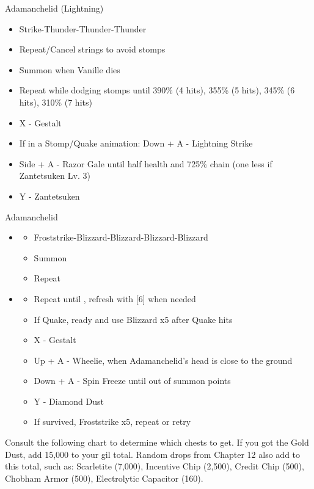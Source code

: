 \begin{paracol}{2}
\begin{battle}{Adamanchelid (Lightning)}
\begin{itemize}
\begin{itemize}
			      \item Strike-Thunder-Thunder-Thunder
			      \item Repeat/Cancel strings to avoid stomps
			      \item Summon when Vanille dies
			      \item Repeat while dodging stomps until 390\% (4 hits), 355\% (5 hits), 345\% (6 hits), 310\% (7 hits)
			      \item X - Gestalt
			      \item If in a Stomp/Quake animation: Down + A - Lightning Strike
			      \item Side + A - Razor Gale until half health and 725\% chain (one less if Zantetsuken Lv. 3)
			      \item Y - Zantetsuken
		      \end{itemize}
	\end{itemize}
\end{battle}
\switchcolumn
\begin{battle}{Adamanchelid}
	\begin{itemize}
		\item \sixth
		      \begin{itemize}
			      \item Froststrike-Blizzard-Blizzard-Blizzard-Blizzard
			      \item Summon
			      \item Repeat
		      \end{itemize}
		\item \fifth
		      \begin{itemize}
			      \item Repeat until \stagger, refresh with [6] when needed
			      \item If Quake, ready and use Blizzard x5 after Quake hits
			      \item X - Gestalt
			      \item Up + A - Wheelie, when Adamanchelid's head is close to the ground
			      \item Down + A - Spin Freeze until out of summon points
			      \item Y - Diamond Dust
			      \item If survived, Froststrike x5, repeat or retry
		      \end{itemize}
	\end{itemize}
\end{battle}
\switchcolumn*
Consult the following chart to determine which chests to get. If you got the Gold Dust, add 15,000 to your gil total. Random drops from Chapter 12 also add to this total, such as: Scarletite (7,000), Incentive Chip (2,500), Credit Chip (500), Chobham Armor (500), Electrolytic Capacitor (160).


\end{paracol}
